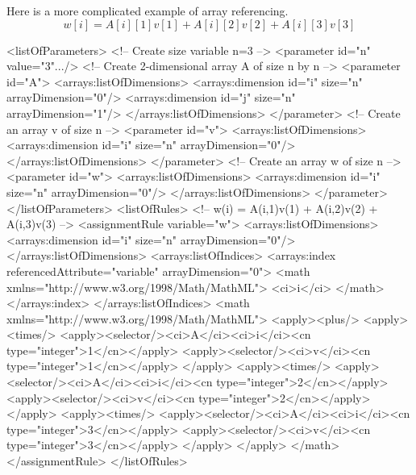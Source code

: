 Here is a more complicated example of array referencing.
\begin{displaymath}
w[i]= A[i][1]v[1]+ A[i][2]v[2]+ A[i][3]v[3]
\end{displaymath}

\begin{example}
<listOfParameters> 
 <!-- Create size variable n=3 -->
 <parameter id="n" value="3".../>
 <!-- Create 2-dimensional array A of size n by n -->
 <parameter id="A">
  <arrays:listOfDimensions>
   <arrays:dimension id="i" size="n" arrayDimension="0"/> 
   <arrays:dimension id="j" size="n" arrayDimension="1"/>
  </arrays:listOfDimensions> 
 </parameter> 
 <!-- Create an array v of size n -->
 <parameter id="v">
  <arrays:listOfDimensions>
   <arrays:dimension id="i" size="n" arrayDimension="0"/>
  </arrays:listOfDimensions> 
 </parameter> 
 <!-- Create an array w of size n -->
 <parameter id="w">
  <arrays:listOfDimensions>
   <arrays:dimension id="i" size="n" arrayDimension="0"/>
  </arrays:listOfDimensions> 
 </parameter>
</listOfParameters>
<listOfRules>
 <!-- w(i) = A(i,1)v(1) + A(i,2)v(2) + A(i,3)v(3) -->
 <assignmentRule variable="w">
  <arrays:listOfDimensions>
   <arrays:dimension id="i" size="n" arrayDimension="0"/>
  </arrays:listOfDimensions> 
  <arrays:listOfIndices>
   <arrays:index referencedAttribute="variable" arrayDimension="0">
    <math xmlns="http://www.w3.org/1998/Math/MathML">
      <ci>i</ci>
    </math>
   </arrays:index>
  </arrays:listOfIndices>
  <math xmlns="http://www.w3.org/1998/Math/MathML">
   <apply><plus/>
    <apply><times/>
     <apply><selector/><ci>A</ci><ci>i</ci><cn type="integer">1</cn></apply>
     <apply><selector/><ci>v</ci><cn type="integer">1</cn></apply>
    </apply>
    <apply><times/>
     <apply><selector/><ci>A</ci><ci>i</ci><cn type="integer">2</cn></apply>
     <apply><selector/><ci>v</ci><cn type="integer">2</cn></apply>
    </apply>
    <apply><times/>
     <apply><selector/><ci>A</ci><ci>i</ci><cn type="integer">3</cn></apply>
     <apply><selector/><ci>v</ci><cn type="integer">3</cn></apply>
    </apply>
   </apply>
  </math>
 </assignmentRule>
</listOfRules>
\end{example}



